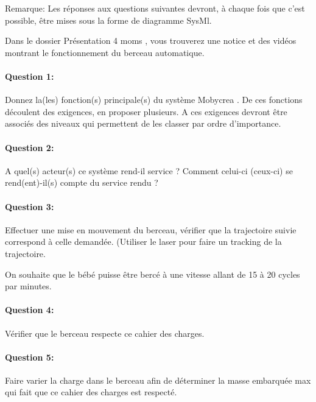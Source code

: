 



Remarque: Les réponses aux questions suivantes devront, à chaque fois que c'est possible, être mises sous la forme de diagramme SysMl.


Dans le dossier \og Présentation 4 moms \fg, vous trouverez une notice et des vidéos montrant le fonctionnement du berceau automatique.

\paragraph{Question 1:} Donnez la(les) fonction(s) principale(s) du système \og Mobycrea \fg. De ces fonctions découlent des exigences, en proposer plusieurs. A ces exigences devront être associés des niveaux qui permettent de les classer par ordre d'importance.

\paragraph{Question 2:} A quel(s) acteur(s) ce système rend-il service ? Comment celui-ci (ceux-ci) se rend(ent)-il(s) compte du service rendu ?


\paragraph{Question 3:} Effectuer une mise en mouvement du berceau, vérifier que la trajectoire suivie correspond à celle demandée. (Utiliser le laser pour faire un tracking de la trajectoire.

On souhaite que le bébé puisse être bercé à une vitesse allant de 15 à 20 cycles par minutes.

\paragraph{Question 4:} Vérifier que le berceau respecte ce cahier des charges.

\paragraph{Question 5:} Faire varier la charge dans le berceau afin de déterminer la masse embarquée max qui fait que ce cahier des charges est respecté.

